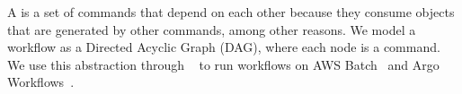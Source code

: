A  is a set of commands that depend on each other because they consume objects that are generated by other commands, among other reasons. We model a workflow as a Directed Acyclic Graph (DAG), where each node is a command. We use this abstraction through ~\cite{NetworkX} to run workflows on AWS Batch~\cite{aws_batch} and Argo Workflows~\cite{argoflow}.